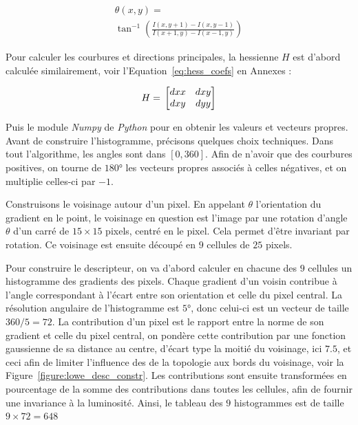 \documentclass[
	a4paper, %
	10pt, %
	unnumberedsections, %
	twoside, %
]{LTJournalArticle}
\begin{document}
\begin{multline}
	\theta(x, y) = \\
	\tan^{-1}\left(\frac{I(x,y+1)-I(x,y-1)}{I(x+1, y) - I(x-1,y)}\right)
\end{multline}

Pour calculer les courbures et directions principales, la hessienne $H$ est d'abord calculée
similairement, voir l'Equation~\ref{eq:hess_coefs} en Annexes :

\begin{equation}
	H = \\
	\begin{bmatrix}
		dxx & dxy \\
		dxy & dyy
	\end{bmatrix}
\end{equation}

Puis le module \textit{Numpy} de \textit{Python} pour en obtenir les valeurs et vecteurs
propres.
Avant de construire l'histogramme, précisons quelques choix techniques.
Dans tout l'algorithme, les angles sont dans $[0, 360]$. Afin de n'avoir que des
courbures positives, on tourne de $180$° les vecteurs propres associés à celles
négatives, et on multiplie celles-ci par $-1$.

Construisons le voisinage autour d'un pixel. En appelant $\theta$
l'orientation du gradient en le point, le voisinage en question est l'image par
une rotation d'angle $\theta$ d'un carré de $15\times 15$ pixels,
centré en le pixel. Cela permet d'être invariant par rotation.
Ce voisinage est ensuite découpé en $9$ cellules de $25$ pixels.

Pour construire le descripteur, on va d'abord
calculer en chacune des $9$ cellules un histogramme des gradients des pixels.
Chaque gradient d'un voisin contribue à
l'angle correspondant à l'écart entre son orientation et celle du pixel central.
La résolution angulaire de l'histogramme est $5$°, donc celui-ci est un vecteur de taille
$360 / 5 = 72$.
La contribution d'un pixel
est le rapport entre la norme de son gradient et celle du pixel central,
on pondère cette contribution par une fonction gaussienne de sa distance au centre,
d'écart type la moitié du voisinage, ici $7.5$, et ceci afin de limiter l'influence des
de la topologie aux bords du voisinage, voir la Figure~\ref{figure:lowe_desc_constr}.
Les contributions sont ensuite transformées en pourcentage
de la somme des contributions dans toutes les cellules, afin de fournir une invariance
à la luminosité. Ainsi, le tableau des $9$ histogrammes est de taille $9 \times 72 = 648$
\end{document}
